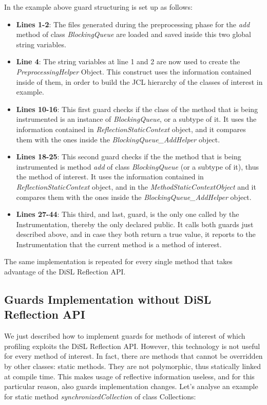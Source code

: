 \documentclass[]{usiinfthesis}
\begin{document}
 In the example above guard structuring is set up as follows:
\begin{itemize}
    \item \textbf{Lines 1-2}: The files generated during the preprocessing phase for the \textit{add} method of class \textit{BlockingQueue} are loaded and saved inside this two global string variables.
    \item \textbf{Line 4}: The string variables at line 1 and 2 are now used to create the \textit{PreprocessingHelper} Object. This construct uses the information contained inside of them, in order to build the JCL hierarchy of the classes of interest in example.
    \item \textbf{Lines 10-16}: This first guard checks if the class of the method that is being instrumented is an instance of \textit{BlockingQueue}, or a subtype of it. It uses the information contained in \textit{ReflectionStaticContext} object, and it compares them with the ones inside the \textit{BlockingQueue\_AddHelper} object.
    \item \textbf{Lines 18-25}: This second guard checks if the the method that is being instrumented is method \textit{add} of class \textit{BlockingQueue} (or a subtype of it), thus the method of interest. It uses the information contained in \textit{ReflectionStaticContext} object, and in the \textit{MethodStaticContextObject} and it compares them with the ones inside the \textit{BlockingQueue\_AddHelper} object.
    \item \textbf{Lines 27-44}: This third, and last, guard, is the only one called by the Instrumentation, thereby the only declared public. It calls both guards just described above, and in case they both return a true value, it reports to the Instrumentation that the current method is a method of interest.
\end{itemize}
The same implementation is repeated for every single method that takes advantage of the DiSL Reflection API.



\subsection{Guards Implementation without DiSL Reflection API}
We just described how to implement guards for methods of interest of which profiling exploits the DiSL Reflection API. However, this technology is not useful for every method of interest. In fact, there are methods that cannot be overridden by other classes: static methods. They are not polymorphic, thus statically linked at compile time. This makes usage of reflective information useless, and for this particular reason, also guards implementation changes. Let's analyse an example for static method \textit{synchronizedCollection} of class Collections:
\end{document}
